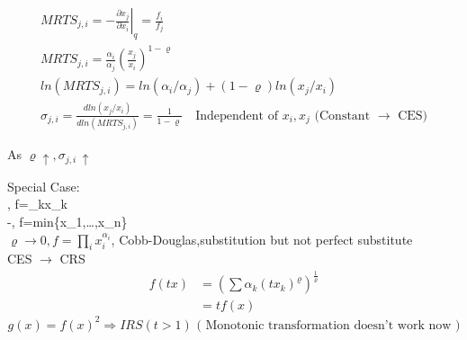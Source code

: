 \documentclass[letterpaper,13pt,single,pdftex]{scrartcl}
\begin{document}
\begin{gather*}
    MRTS_{j,i} =-\left. {\frac{\partial x_j}{\partial x_i}} \right|_q= \frac{f_i}{f_j}\\
    MRTS_{j,i} = \frac{\alpha_i}{\alpha_j}(\frac{x_j}{x_i})^{1-\varrho}\\
    ln(MRTS_{j,i}) = ln (\alpha_i/\alpha_j) +(1-\varrho)ln(x_j/x_i)\\
    \sigma_{j,i} = \frac{dln(x_j/x_i)}{dln(MRTS_{j,i})} = \frac{1}{1-\varrho}\quad \text{Independent of $x_i,x_j$ (Constant $\rightarrow$ CES)}
\end{gather*}  
\begin{center}
    As $\varrho \uparrow, \sigma_{j,i} \,\uparrow$ 
\end{center}
Special Case:\\
\varrho {}, f=\sum \alpha_kx_k\\
\varrho\rightarrow -\infty, f=min\{x_1,\dots,x_n\}\\
$\varrho\rightarrow0, f=\prod\limits_{i}x_i^{\alpha_i}$, Cobb-Douglas,substitution but not perfect substitute\\
CES $\rightarrow$ CRS
\begin{align*}
f(tx) &= (\sum \alpha_k(tx_k)^\varrho)^{\frac{1}{\varrho}}\\
&=tf(x)
\end{align*}
\[g(x) = f(x)^2 \Rightarrow IRS (t>1)\text{   ( Monotonic transformation doesn't work now )}\]
\end{document}
